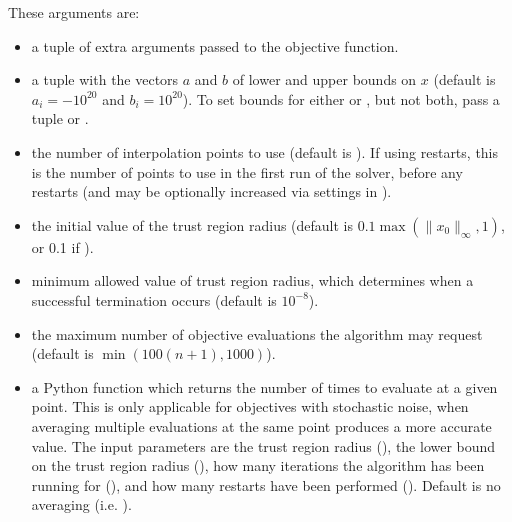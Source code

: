 \documentclass[letterpaper,10pt,english]{sphinxmanual}
\begin{document}
These arguments are:
\begin{itemize}
\item {} 
 \sphinxhyphen{} a tuple of extra arguments passed to the objective function.

\item {} 
 \sphinxhyphen{} a tuple  with the vectors \(a\) and \(b\) of lower and upper bounds on \(x\) (default is \(a_i=-10^{20}\) and \(b_i=10^{20}\)). To set bounds for either  or , but not both, pass a tuple  or .

\item {} 
 \sphinxhyphen{} the number of interpolation points to use (default is ). If using restarts, this is the number of points to use in the first run of the solver, before any restarts (and may be optionally increased via settings in ).

\item {} 
 \sphinxhyphen{} the initial value of the trust region radius (default is \(0.1\max(\|x_0\|_{\infty}, 1)\), or 0.1 if ).

\item {} 
 \sphinxhyphen{} minimum allowed value of trust region radius, which determines when a successful termination occurs (default is \(10^{-8}\)).

\item {} 
 \sphinxhyphen{} the maximum number of objective evaluations the algorithm may request (default is \(\min(100(n+1),1000)\)).

\item {} 
 \sphinxhyphen{} a Python function  which returns the number of times to evaluate  at a given point. This is only applicable for objectives with stochastic noise, when averaging multiple evaluations at the same point produces a more accurate value. The input parameters are the trust region radius (), the lower bound on the trust region radius (), how many iterations the algorithm has been running for (), and how many restarts have been performed (). Default is no averaging (i.e. ).


\end{itemize}
\end{document}
